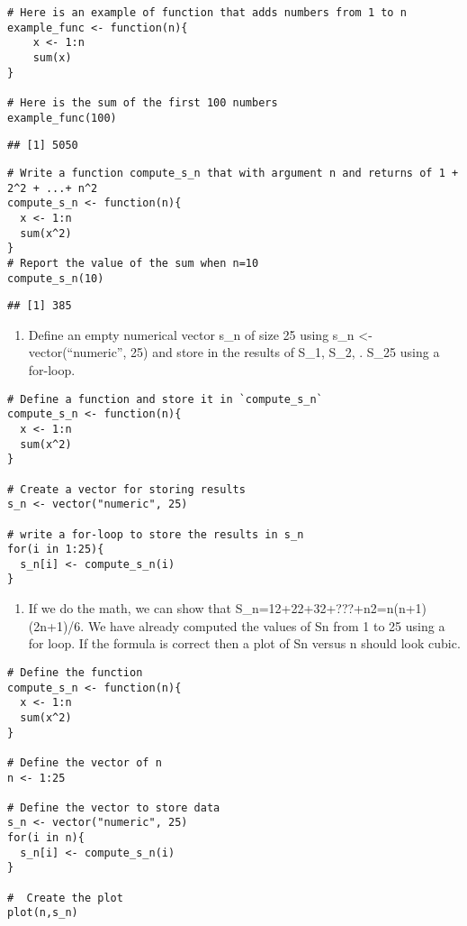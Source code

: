 \documentclass[]{article}
\providecommand{\tightlist}{%
  \setlength{\itemsep}{0pt}\setlength{\parskip}{0pt}}
\begin{document}
\begin{verbatim}
# Here is an example of function that adds numbers from 1 to n
example_func <- function(n){
    x <- 1:n
    sum(x)
}

# Here is the sum of the first 100 numbers
example_func(100)
\end{verbatim}

\begin{verbatim}
## [1] 5050
\end{verbatim}

\begin{verbatim}
# Write a function compute_s_n that with argument n and returns of 1 + 2^2 + ...+ n^2
compute_s_n <- function(n){
  x <- 1:n
  sum(x^2)
}
# Report the value of the sum when n=10
compute_s_n(10)
\end{verbatim}

\begin{verbatim}
## [1] 385
\end{verbatim}

\begin{enumerate}
\def\labelenumi{\arabic{enumi}.}
\setcounter{enumi}{7}
\tightlist
\item
  Define an empty numerical vector s\_n of size 25 using s\_n
  \textless{}- vector(``numeric'', 25) and store in the results of S\_1,
  S\_2, . S\_25 using a for-loop.
\end{enumerate}

\begin{verbatim}
# Define a function and store it in `compute_s_n`
compute_s_n <- function(n){
  x <- 1:n
  sum(x^2)
}

# Create a vector for storing results
s_n <- vector("numeric", 25)

# write a for-loop to store the results in s_n
for(i in 1:25){
  s_n[i] <- compute_s_n(i)
}
\end{verbatim}

\begin{enumerate}
\def\labelenumi{\arabic{enumi}.}
\setcounter{enumi}{8}
\tightlist
\item
  If we do the math, we can show that
  S\_n=12+22+32+???+n2=n(n+1)(2n+1)/6. We have already computed the
  values of Sn from 1 to 25 using a for loop. If the formula is correct
  then a plot of Sn versus n should look cubic.
\end{enumerate}

\begin{verbatim}
# Define the function
compute_s_n <- function(n){
  x <- 1:n
  sum(x^2)
}

# Define the vector of n
n <- 1:25

# Define the vector to store data
s_n <- vector("numeric", 25)
for(i in n){
  s_n[i] <- compute_s_n(i)
}

#  Create the plot 
plot(n,s_n)
\end{verbatim}
\end{document}
